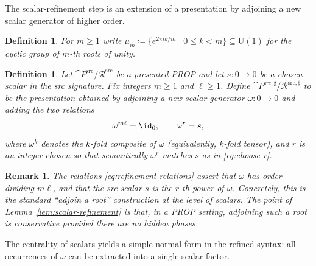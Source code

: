 \documentclass[10pt,a4paper]{article}
\newtheorem{definition}[theorem]{Definition}
\newtheorem{remark}[theorem]{Remark}
\def\cref#1{Lemma~\ref{#1}}%
\begin{document}
The scalar-refinement step is an extension of a presentation by adjoining a new scalar generator of
higher order.

\begin{definition}\label{def:mu_m}
For $m\ge 1$ write
\(
  \mu_m \coloneqq \{e^{2\pi i k/m}\mid 0\le k<m\}\subseteq \mathrm{U}(1)
\)
for the cyclic group of $m$-th roots of unity.
\end{definition}

\begin{definition}\label{def:scalar-refined-presentation}
Let $\cat{P}^{\mathrm{src}}/\mathcal{R}^{\mathrm{src}}$ be a presented PROP and let
$s:0\to 0$ be a chosen scalar in the \emph{src} signature.
Fix integers $m\ge 1$ and $\ell\ge 1$.
Define $\cat{P}^{\mathrm{src},\sharp}/\mathcal{R}^{\mathrm{src},\sharp}$ to be the
presentation obtained by adjoining a new scalar generator
\(
  \omega:0\to 0
\)
and adding the two relations
\begin{equation}\label{eq:refinement-relations}
  \omega^{m\ell}=\id_0,
  \qquad
  \omega^{r}=s,
\end{equation}
where $\omega^k$ denotes the $k$-fold composite of $\omega$ (equivalently, $k$-fold tensor),
and $r$ is an integer chosen so that semantically $\omega^r$ matches $s$ as in
\eqref{eq:choose-r}.
\end{definition}

\begin{remark}\label{rem:refinement-intuition}
The relations \eqref{eq:refinement-relations} assert that $\omega$ has order dividing $m\ell$,
and that the \emph{src} scalar $s$ is the $r$-th power of $\omega$.  Concretely, this is the
standard ``adjoin a root'' construction at the level of scalars.  The point of
\cref{lem:scalar-refinement} is that, in a PROP setting, adjoining such a root is
conservative provided there are no hidden phases.
\end{remark}


The centrality of scalars yields a simple normal form in the refined syntax: all occurrences of
$\omega$ can be extracted into a single scalar factor.
\end{document}
